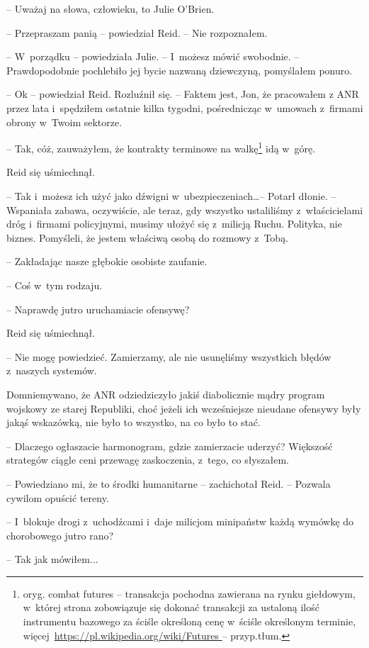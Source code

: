 \documentclass[oneside,polish,11pt,sfheadings]{mwbk}
\begin{document}
-- Uważaj na słowa, człowieku, to Julie O'Brien.

-- Przepraszam panią -- powiedział Reid. -- Nie rozpoznałem.

-- W~porządku -- powiedziała Julie. -- I~możesz mówić swobodnie. -- Prawdopodobnie pochlebiło jej bycie nazwaną dziewczyną, pomyślałem
ponuro.

-- Ok -- powiedział Reid. Rozluźnił się. -- Faktem jest, Jon, że pracowałem
z ANR przez lata i~spędziłem ostatnie kilka tygodni, pośrednicząc w~umowach z~firmami obrony w~Twoim sektorze.

-- Tak, cóż, zauważyłem, że kontrakty terminowe na walkę\footnote{oryg. combat
futures -- transakcja pochodna zawierana na rynku giełdowym, w~której
strona zobowiązuje się dokonać transakcji za ustaloną ilość instrumentu
bazowego za ściśle określoną cenę w~ściśle określonym terminie,
więcej~\url{https://pl.wikipedia.org/wiki/Futures } -- przyp.tłum.} idą w~górę.

Reid się uśmiechnął. 

-- Tak i~możesz ich użyć jako dźwigni w~ubezpieczeniach\ldots -- Potarł dłonie. -- Wspaniała zabawa, oczywiście, ale teraz, gdy wszystko ustaliliśmy z~właścicielami dróg i~firmami policyjnymi, musimy ułożyć się z~milicją Ruchu. Polityka, nie biznes.
Pomyśleli, że jestem właściwą osobą do rozmowy z~Tobą.

-- Zakładając nasze głębokie osobiste zaufanie.

-- Coś w~tym rodzaju.

-- Naprawdę jutro uruchamiacie ofensywę?

Reid się uśmiechnął. 

-- Nie mogę powiedzieć. Zamierzamy, ale nie
usunęliśmy wszystkich błędów z~naszych systemów.

Domniemywano, że ANR odziedziczyło jakiś diabolicznie mądry program
wojskowy ze starej Republiki, choć jeżeli ich wcześniejsze nieudane
ofensywy były jakąś wskazówką, nie było to wszystko, na co było to stać.

-- Dlaczego ogłaszacie harmonogram, gdzie zamierzacie uderzyć? Większość
strategów ciągle ceni przewagę zaskoczenia, z~tego, co słyszałem.

-- Powiedziano mi, że to środki humanitarne -- zachichotał Reid. -- Pozwala
cywilom opuścić tereny.

-- I~blokuje drogi z~uchodźcami i~daje milicjom minipaństw każdą wymówkę
do chorobowego jutro rano?

-- Tak jak mówiłem...
\end{document}
